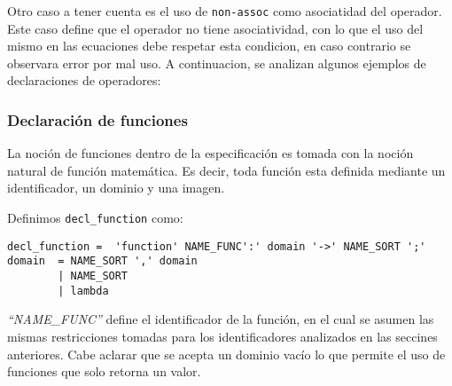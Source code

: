 Otro caso a tener cuenta es el uso de \texttt{non-assoc} como asociatidad del operador. Este caso define que el operador no tiene asociatividad, con lo que el uso del mismo en las ecuaciones debe respetar esta condicion, en caso contrario se observara error por mal uso.
A continuacion, se analizan algunos ejemplos de declaraciones de operadores:\\


\subsubsection{Declaración de funciones}
 La noción de funciones dentro de la especificación es tomada con la noción natural de función matemática. Es decir, toda función esta definida mediante un identificador, un dominio y una imagen.

Definimos \texttt{decl\_function} como:
\begin{center}
\lstset{language=inform}
\scriptsize
\begin{lstlisting}[frame=single]
decl_function =  'function' NAME_FUNC':' domain '->' NAME_SORT ';'
domain  = NAME_SORT ',' domain
        | NAME_SORT 
        | lambda
\end{lstlisting}
\end{center}
\textit{``NAME\_FUNC''} define el identificador de la función, en el cual se asumen las mismas restricciones tomadas para los identificadores analizados en las seccines anteriores. Cabe aclarar que se acepta un dominio vacío lo que permite el uso de funciones que solo retorna un valor.

